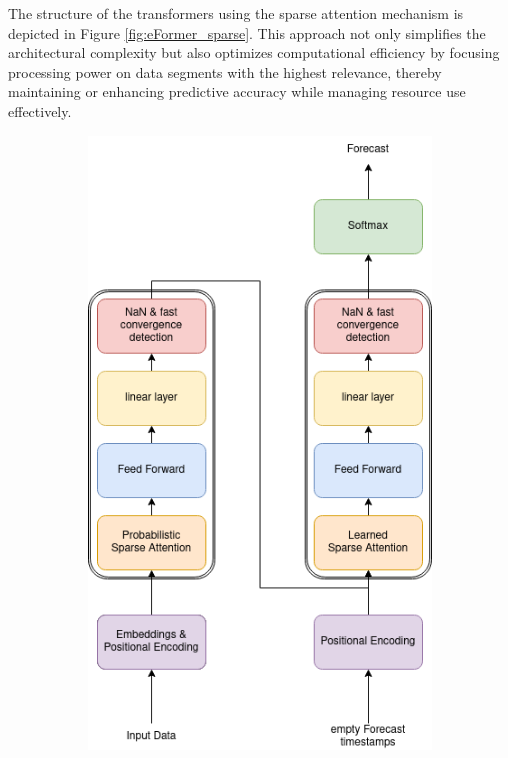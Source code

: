 \documentclass{article}
\begin{document}
The structure of the transformers using the sparse attention mechanism is depicted in Figure \ref{fig:eFormer_sparse}. This approach not only simplifies the architectural complexity but also optimizes computational efficiency by focusing processing power on data segments with the highest relevance, thereby maintaining or enhancing predictive accuracy while managing resource use effectively.

\begin{figure}
    \hspace*{\fill}
    \begin{subfigure}[b]{0.4\linewidth}
        \includegraphics[width=\linewidth]{graphs/models/eFormer_probSparse.png}

\end{subfigure}
\end{figure}
\end{document}
